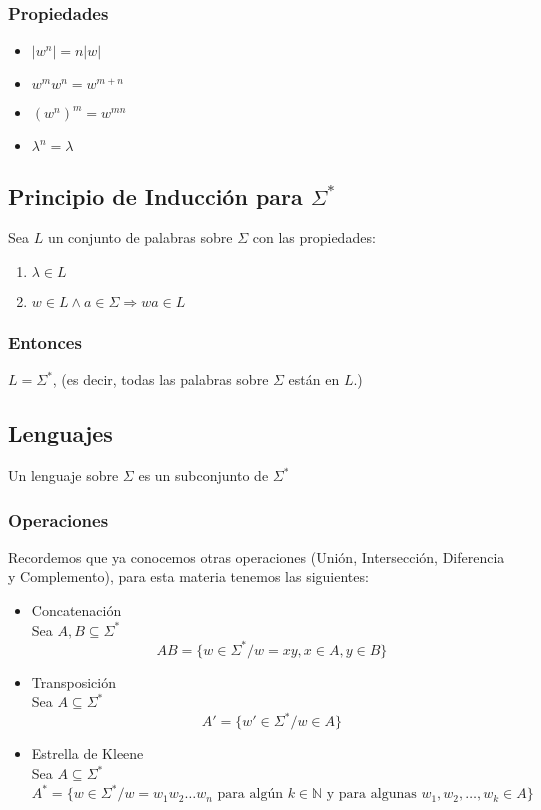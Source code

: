 \subsubsection{Propiedades}
\begin{itemize}
\item $|w^n| = n|w|$
\item $w^m w^n = w^{m+n}$
\item $(w^n)^m = w^{mn}$
\item $\lambda^n = \lambda$
\end{itemize}
\subsection{Principio de Inducción para $\Sigma^*$}
Sea $L$ un conjunto de palabras sobre $\Sigma$ con las propiedades:
\renewcommand{\labelenumi}{\theenumi}
\renewcommand{\theenumi}{\textbf{\roman{enumi}.)}}%
\begin{enumerate}
\item $\lambda \in L$
\item $w\in L \wedge a\in\Sigma \Rightarrow wa \in L$
\end{enumerate}
\subsubsection{Entonces}
$L=\Sigma^*$, (es decir, todas las palabras sobre $\Sigma$ están en $L$.)
\subsection{Lenguajes}
Un lenguaje sobre $\Sigma$ es un subconjunto de $\Sigma^*$
\subsubsection{Operaciones}
Recordemos que ya conocemos otras operaciones (Unión, Intersección, Diferencia y Complemento), para esta materia tenemos las siguientes:
\begin{itemize}
\item Concatenación \\ ${ }$ \\
Sea $A,B \subseteq \Sigma^*$ \\
$$AB =\{ w\in\Sigma^* / w=xy, x\in A, y\in B \}$$
\item Transposición \\ ${ }$ \\
Sea $A\subseteq \Sigma^*$ \\
$$A'=\{ w'\in \Sigma^* /w\in A\} $$
\item Estrella de Kleene \\ ${ }$ \\
Sea $A\subseteq \Sigma^*$ \\
$$A^* = \{w\in\Sigma^* / w=w_1 w_2 \ldots w_n \text{ para algún } k\in\mathbb{N} \text{ y para algunas }w_1,w_2,\ldots,w_k \in A\}$$
\end{itemize}
